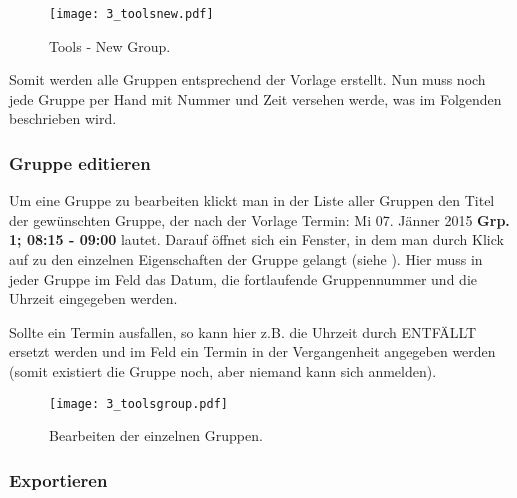 \begin{figure}[htbp]
  \texttt{[image: 3\_toolsnew.pdf]}
  \caption{ Tools - New Group.}
  \label{fig:toolsnew}
\end{figure}

Somit werden alle Gruppen entsprechend der Vorlage erstellt. Nun muss noch jede
Gruppe per Hand mit Nummer und Zeit versehen werde, was im Folgenden beschrieben
wird.

\subsubsection{Gruppe editieren}

Um eine Gruppe zu bearbeiten klickt man in der Liste aller Gruppen den Titel
der gewünschten Gruppe, der nach der Vorlage 
\glqq{}Termin: Mi 07. Jänner 2015 {\bf Grp. 1; 08:15 - 09:00}\grqq{} lautet.
Darauf öffnet sich ein Fenster, in dem man durch Klick auf 
zu den einzelnen Eigenschaften der Gruppe gelangt (siehe 
). Hier muss in jeder Gruppe im Feld  das
Datum, die fortlaufende Gruppennummer und die Uhrzeit eingegeben werden.

Sollte ein Termin ausfallen, so kann hier z.B. die Uhrzeit durch 
\glqq{}ENTFÄLLT\grqq{} ersetzt werden und im Feld 
ein Termin in der Vergangenheit angegeben werden (somit existiert die Gruppe
noch, aber niemand kann sich anmelden).

\begin{figure}[htbp]
  \texttt{[image: 3\_toolsgroup.pdf]}
  \caption{ Bearbeiten der einzelnen Gruppen.}
  \label{fig:toolsgroup}
\end{figure}

\newpage
\subsubsection{Exportieren}

